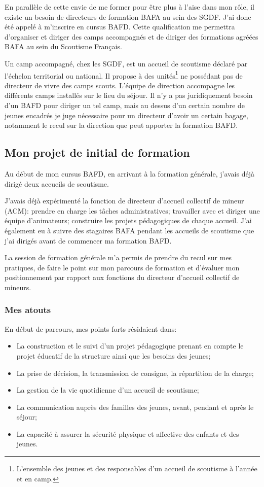 \documentclass[titlepage,11pt,a4paper]{article}
\begin{document}
En parallèle de cette envie de me former pour être plus à l'aise dans mon rôle,
il existe un besoin de directeurs de formation BAFA au sein des SGDF\@. J'ai donc été appelé
à m'inscrire en cursus BAFD\@. Cette qualification me permettra d'organiser et diriger des
camps accompagnés et de diriger des formations agréées BAFA au sein du Scoutisme Français.

Un camp accompagné, chez les SGDF, est un accueil de scoutisme déclaré par l'échelon
territorial ou national. Il propose à des unités\footnote{L'ensemble des jeunes et des
responsables d'un accueil de scoutisme à l'année et en camp.} ne possédant pas
de directeur de vivre des camps scouts. L'équipe de direction accompagne les différents
camps installés sur le lieu du séjour. Il n'y a pas juridiquement besoin d'un BAFD pour
diriger un tel camp, mais au dessus d'un certain nombre de jeunes encadrés je juge
nécessaire pour un directeur d'avoir un certain bagage, notamment le recul sur la
direction que peut apporter la formation BAFD\@.

\subsection{Mon projet de initial de formation}

Au début de mon cursus BAFD, en arrivant à la formation générale, j'avais déjà dirigé deux
accueils de scoutisme.

J'avais déjà expérimenté la fonction de directeur d'accueil collectif de mineur (ACM):
prendre en charge les tâches administratives; travailler avec et diriger une équipe d'animateurs;
construire les projets pédagogiques de chaque accueil. J'ai également eu à suivre des
stagaires BAFA pendant les accueils de scoutisme que j'ai dirigés avant de commencer ma
formation BAFD\@.

La session de formation générale m'a permis de prendre du recul sur mes pratiques, de
faire le point sur mon parcours de formation et d'évaluer mon positionnement par rapport
aux fonctions du directeur d'accueil collectif de mineurs.

\subsubsection{Mes atouts}

En début de parcours, mes points forts résidaient dans:

\begin{itemize}
   \item La construction et le suivi d'un projet pédagogique prenant en compte le
      projet éducatif de la structure ainsi que les besoins des jeunes;
   \item La prise de décision, la transmission de consigne, la répartition de la charge;
   \item La gestion de la vie quotidienne d'un accueil de scoutisme;
   \item La communication auprès des familles des jeunes, avant, pendant et après le
      séjour;
   \item La capacité à assurer la sécurité physique et affective des enfants et des
      jeunes.
\end{itemize}
\end{document}
